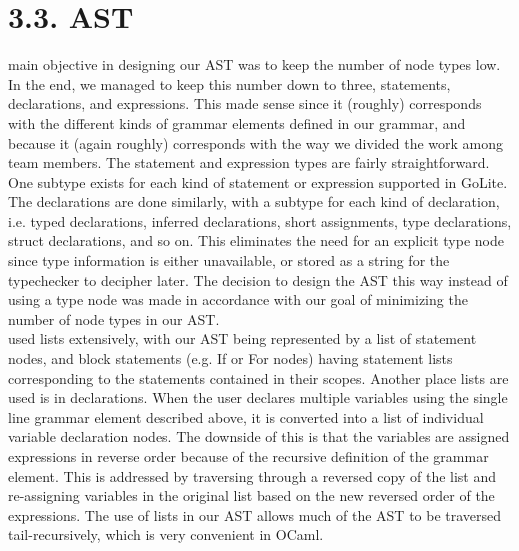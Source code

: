 \documentclass{article}
\begin{document}
\section*{3.3. AST}\mbox{}
 main objective in designing our AST was to keep the number of node types low.
In the end, we managed to keep this number down to three, statements, declarations, and expressions.
This made sense since it (roughly) corresponds with the different kinds of grammar elements defined in our grammar, and because it (again roughly) corresponds with the way we divided the work among team members.
The statement and expression types are fairly straightforward.
One subtype exists for each kind of statement or expression supported in GoLite.
The declarations are done similarly, with a subtype for each kind of declaration, i.e. typed declarations, inferred declarations, short assignments, type declarations, struct declarations, and so on.
This eliminates the need for an explicit type node since type information is either unavailable, or stored as a string for the typechecker to decipher later.
The decision to design the AST this way instead of using a type node was made in accordance with our goal of minimizing the number of node types in our AST.\\ 
 used lists extensively, with our AST being represented by a list of statement nodes, and block statements (e.g. If or For nodes) having statement lists corresponding to the statements contained in their scopes.
Another place lists are used is in declarations.
When the user declares multiple variables using the single line grammar element described above, it is converted into a list of individual variable declaration nodes.
The downside of this is that the variables are assigned expressions in reverse order because of the recursive definition of the grammar element.
This is addressed by traversing through a reversed copy of the list and re-assigning variables in the original list based on the new reversed order of the expressions.
The use of lists in our AST allows much of the AST to be traversed tail-recursively, which is very convenient in OCaml.
\end{document}
